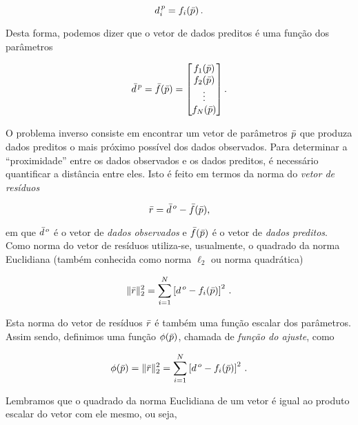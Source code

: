 \[
d^{\thinspace p}_i = f_i(\bar{p})\thinspace.
\]

\noindent Desta forma, podemos dizer que o vetor de dados preditos é uma função
dos parâmetros

\begin{equation}
\bar{d}^{\thinspace p}= \bar{f}(\bar{p}) =
    \begin{bmatrix}
    f_1(\bar{p}) \\
    f_2(\bar{p}) \\
    \vdots \\
    f_N(\bar{p})
    \end{bmatrix}.
\label{eq:dados_preditos}
\end{equation}

\indent O problema inverso consiste em encontrar um vetor de parâmetros $\bar{p}$
que produza dados preditos o mais próximo possível dos dados observados.
Para determinar a ``proximidade'' entre os dados observados e os dados preditos,
é necessário quantificar a distância entre eles.
Isto é feito em termos da norma do {\it vetor de resíduos}

\begin{equation}
\bar{r} = \bar{d}^{\thinspace o} - \bar{f}(\bar{p}),
\end{equation}

\noindent em que $\bar{d}^{\thinspace o}$ é o vetor de {\it dados observados}
e $\bar{f}(\bar{p})$ é o vetor de {\it dados preditos}.
\\
\indent Como norma do vetor de resíduos utiliza-se, usualmente, o quadrado da
norma Euclidiana (também conhecida como norma $\ell_2$ ou norma quadrática)

\begin{equation}
\lVert\bar{r}\rVert_2^2 =
    \sum\limits_{i=1}^N \left[d^{\thinspace o} - f_i(\bar{p})\right]^2 \, .
\end{equation}

\noindent Esta norma do vetor de resíduos $\bar{r}$ é também uma função escalar
dos parâmetros. Assim sendo, definimos uma função $\phi(\bar{p})$, chamada de
{\it função do ajuste}, como

\begin{equation}
\phi(\bar{p}) = \lVert\bar{r}\rVert_2^2 =
    \sum\limits_{i=1}^N \left[d^{\thinspace o} - f_i(\bar{p})\right]^2 \, .
\label{eq:ajuste_sum}
\end{equation}

\indent Lembramos que o quadrado da norma Euclidiana de um vetor é igual ao
produto escalar do vetor com ele mesmo, ou seja,

